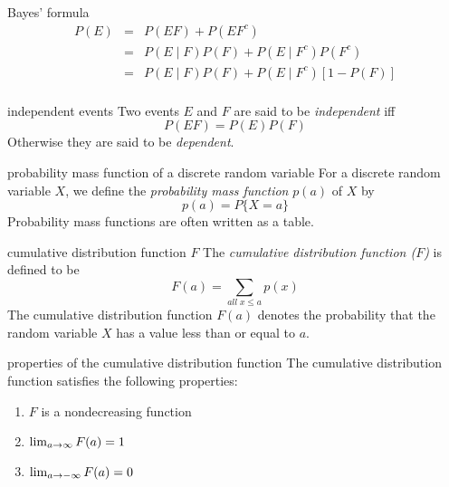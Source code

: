 \documentclass[avery5371,grid]{flashcards}
\def\lim{\mathop{\rm lim}}
\begin{document}
\begin{flashcard}[Theorem]{Bayes' formula}
\begin{eqnarray*}
P(E) &=& P(E F) + P(E F^c) \\
     &=& P(E\mid F)P(F) + P(E\mid F^c)P(F^c) \\
     &=& P(E\mid F)P(F) + P(E\mid F^c)[1-P(F)] \\
\end{eqnarray*}
\end{flashcard}

\begin{flashcard}[Definition]{independent events}
Two events $E$ and $F$ are said to be \textit{independent} iff
\begin{displaymath}
P(EF) = P(E)P(F)
\end{displaymath}
Otherwise they are said to be \textit{dependent}.
\end{flashcard}

\begin{flashcard}[Definition]{probability mass function of
a discrete random variable}
For a discrete random variable $X$, we define the
\textit{probability mass function} $p(a)$ of $X$ by
\begin{displaymath}
p(a) = P\lbrace X=a \rbrace
\end{displaymath}
Probability mass functions are often written as a table.
\end{flashcard}

\begin{flashcard}[Definition]{cumulative distribution function $F$}
The \textit{cumulative distribution function ($F$)} is defined to be
\begin{displaymath}
F(a) = \sum_{all \; x \leq a} p(x)
\end{displaymath}
The cumulative distribution function $F(a)$ denotes the probability
that the random variable $X$ has a value less than or equal to $a$.
\end{flashcard}

\begin{flashcard}[Theorem]{properties of the cumulative 
distribution function}
The cumulative distribution function satisfies the following properties:
\begin{enumerate}
\item $F$ is a nondecreasing function
\item $\lim_{a\to\infty} F(a) = 1$
\item $\lim_{a\to-\infty} F(a) = 0$
\end{enumerate}
\end{flashcard}
\end{document}
